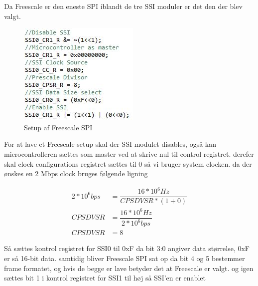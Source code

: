 Da Freescale er den eneste SPI iblandt de tre SSI moduler er det den der blev valgt.

		\begin{figure}[H]
			\begin{center}
			\includegraphics[scale=0.8]{Billeder/Spi_Setup.jpg}
			\end{center}
			\label{fig:SPI_Setup}
			\caption{Setup af Freescale SPI}
		\end{figure}

For at lave et Freescale setup skal der SSI modulet disables, også kan microcontrolleren sættes som master ved at skrive nul til control registret.
derefer skal clock configurations registret sættes til 0 så vi bruger system clocken.
da der ønskes en 2 Mbps clock bruges følgende ligning

\begin{align*}
2*10^6 bps &= \dfrac{16*10^6 Hz}{CPSDVSR * (1 + 0)}\\
CPSDVSR &= \dfrac{16*10^6 Hz}{2*10^6 bps}\\
CPSDVSR &= 8
\end{align*}

Så sættes kontrol registret for SSI0 til 0xF da bit 3:0 angiver data størrelse, 0xF er så 16-bit data. samtidig bliver Freescale SPI sat op da bit 4 og 5 bestemmer frame formatet, og hvis de begge er lave betyder det at Freescale er valgt. 
og igen sættes bit 1 i kontrol registret for SSI1 til høj så SSI'en er enablet
